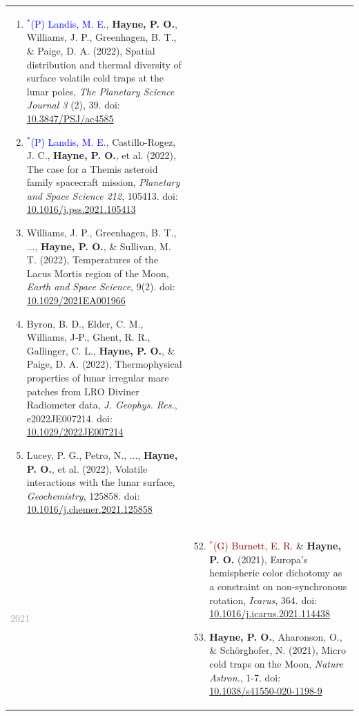 \documentclass[letterpaper,10pt,twoside]{article}
\begin{document}
\begin{longtable}{@{} p{} p{}}
\begin{enumerate}[leftmargin=!,labelindent=2.5pt,itemindent=-10pt]
{            }
            \item{\small \textcolor{blue}{$^*$(P) Landis, M. E.}, \textbf{Hayne, P. O.}, Williams, J. P., Greenhagen, B. T., \& Paige, D. A. (2022), Spatial distribution and thermal diversity of surface volatile cold traps at the lunar poles, {\it The Planetary Science Journal 3 }(2), 39. doi: \href{https://doi.org/10.3847/PSJ/ac4585}{10.3847/PSJ/ac4585}
            }
            \item{\small \textcolor{blue}{$^*$(P) Landis, M. E.}, Castillo-Rogez, J. C., \textbf{Hayne, P. O.}, et al. (2022), The case for a Themis asteroid family spacecraft mission, {\it Planetary and Space Science 212}, 105413. doi: \href{https://doi.org/10.1016/j.pss.2021.105413}{10.1016/j.pss.2021.105413}
            }            
            \item{\small Williams, J. P., Greenhagen, B. T., ..., \textbf{Hayne, P. O.}, \& Sullivan, M. T. (2022), Temperatures of the Lacus Mortis region of the Moon, {\it Earth and Space Science}, 9(2). doi: \href{https://doi.org/10.1029/2021EA001966}{10.1029/2021EA001966}
            }
            \item{\small Byron, B. D., Elder, C. M., Williams, J‐P., Ghent, R. R., Gallinger, C. L., \textbf{Hayne, P. O.}, \& Paige, D. A. (2022), Thermophysical properties of lunar irregular mare patches from LRO Diviner Radiometer data, {\it J. Geophys. Res.}, e2022JE007214. doi: \href{https://doi.org/10.1029/2022JE007214}{10.1029/2022JE007214}
            }
            \item{\small Lucey, P. G., Petro, N., ..., \textbf{Hayne, P. O.}, et al. (2022), Volatile interactions with the lunar surface, {\it Geochemistry}, 125858. doi: \href{https://doi.org/10.1016/j.chemer.2021.125858}{10.1016/j.chemer.2021.125858}
            }
        \end{enumerate}\\
        \noindent\textcolor{darkgray}{2021} &
        \begin{enumerate}[leftmargin=!,labelindent=2.5pt,itemindent=-10pt]\setcounter{enumi}{51}
            \item{\small \textcolor{darkred}{$^*$(G) Burnett, E. R.} \& \textbf{Hayne, P. O.} (2021), Europa's hemispheric color dichotomy as a constraint on non-synchronous rotation, {\it Icarus}, 364. doi: \href{https://doi.org/10.1016/j.icarus.2021.114438}{10.1016/j.icarus.2021.114438}
            }
            \item{\small \textbf{Hayne, P. O.}, Aharonson, O., \& Sch\"{o}rghofer, N. (2021), Micro cold traps on the Moon, {\it Nature Astron.}, 1-7. doi: \href{https://doi.org/10.1038/s41550-020-1198-9}{10.1038/s41550-020-1198-9}
}
\end{enumerate}
\end{longtable}
\end{document}
